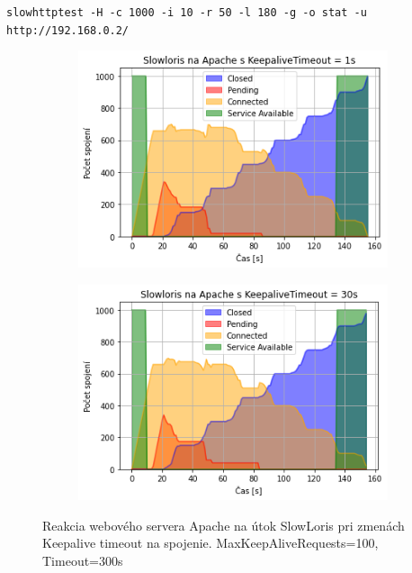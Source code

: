 \documentclass[12pt, a4paper]{article}
\begin{document}
\begin{lrbox}{\shield}
\verb|slowhttptest -H -c 1000 -i 10 -r 50 -l 180 -g -o stat -u http://192.168.0.2/|
\end{lrbox}
\begin{figure}[h!]
	\centering
	\begin{subfigure}[t]{.48\textwidth}
  		\centering
  		\includegraphics[width=\textwidth]{images/Apache-slowhttptest-1s.png}
	\end{subfigure}
	\begin{subfigure}[t]{.48\textwidth}
  		\centering
  		\includegraphics[width=\textwidth]{images/Apache-slowhttptest-30s.png}
	\end{subfigure}
	\caption{Reakcia webového servera Apache na útok SlowLoris pri zmenách Keepalive timeout
	na spojenie. MaxKeepAliveRequests=100, Timeout=300s \\ \usebox{\shield}}
	\label{apache-slowloris}
\end{figure}
\end{document}
